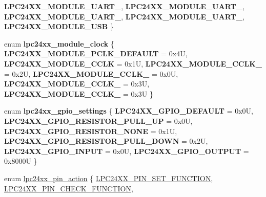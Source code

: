 \begin{DoxyCompactItemize}
{\bfseries L\+P\+C24\+X\+X\+\_\+\+M\+O\+D\+U\+L\+E\+\_\+\+U\+A\+R\+T\+\_}, 
{\bfseries L\+P\+C24\+X\+X\+\_\+\+M\+O\+D\+U\+L\+E\+\_\+\+U\+A\+R\+T\+\_}, 
{\bfseries L\+P\+C24\+X\+X\+\_\+\+M\+O\+D\+U\+L\+E\+\_\+\+U\+A\+R\+T\+\_}, 
\newline
{\bfseries L\+P\+C24\+X\+X\+\_\+\+M\+O\+D\+U\+L\+E\+\_\+\+U\+A\+R\+T\+\_}, 
{\bfseries L\+P\+C24\+X\+X\+\_\+\+M\+O\+D\+U\+L\+E\+\_\+\+U\+SB}
 \}
\item 
\mbox{\label{group__lpc24xx__io_gadac3c8787ce026e5996808d7efb3c546}} 
enum {\bfseries lpc24xx\+\_\+module\+\_\+clock} \{ \newline
{\bfseries L\+P\+C24\+X\+X\+\_\+\+M\+O\+D\+U\+L\+E\+\_\+\+P\+C\+L\+K\+\_\+\+D\+E\+F\+A\+U\+LT} = 0x4U, 
{\bfseries L\+P\+C24\+X\+X\+\_\+\+M\+O\+D\+U\+L\+E\+\_\+\+C\+C\+LK} = 0x1U, 
{\bfseries L\+P\+C24\+X\+X\+\_\+\+M\+O\+D\+U\+L\+E\+\_\+\+C\+C\+L\+K\+\_} = 0x2U, 
{\bfseries L\+P\+C24\+X\+X\+\_\+\+M\+O\+D\+U\+L\+E\+\_\+\+C\+C\+L\+K\+\_} = 0x0U, 
\newline
{\bfseries L\+P\+C24\+X\+X\+\_\+\+M\+O\+D\+U\+L\+E\+\_\+\+C\+C\+L\+K\+\_} = 0x3U, 
{\bfseries L\+P\+C24\+X\+X\+\_\+\+M\+O\+D\+U\+L\+E\+\_\+\+C\+C\+L\+K\+\_} = 0x3U
 \}
\item 
\mbox{\label{group__lpc24xx__io_ga0f0e1497847902b3f6fce2720a286971}} 
enum {\bfseries lpc24xx\+\_\+gpio\+\_\+settings} \{ \newline
{\bfseries L\+P\+C24\+X\+X\+\_\+\+G\+P\+I\+O\+\_\+\+D\+E\+F\+A\+U\+LT} = 0x0U, 
{\bfseries L\+P\+C24\+X\+X\+\_\+\+G\+P\+I\+O\+\_\+\+R\+E\+S\+I\+S\+T\+O\+R\+\_\+\+P\+U\+L\+L\+\_\+\+UP} = 0x0U, 
{\bfseries L\+P\+C24\+X\+X\+\_\+\+G\+P\+I\+O\+\_\+\+R\+E\+S\+I\+S\+T\+O\+R\+\_\+\+N\+O\+NE} = 0x1U, 
{\bfseries L\+P\+C24\+X\+X\+\_\+\+G\+P\+I\+O\+\_\+\+R\+E\+S\+I\+S\+T\+O\+R\+\_\+\+P\+U\+L\+L\+\_\+\+D\+O\+WN} = 0x2U, 
\newline
{\bfseries L\+P\+C24\+X\+X\+\_\+\+G\+P\+I\+O\+\_\+\+I\+N\+P\+UT} = 0x0U, 
{\bfseries L\+P\+C24\+X\+X\+\_\+\+G\+P\+I\+O\+\_\+\+O\+U\+T\+P\+UT} = 0x8000U
 \}
\item 
enum \mbox{\hyperlink{group__lpc24xx__io_ga5fb61bf67da6335979ce02d1d7f3630e}{lpc24xx\+\_\+pin\+\_\+action}} \{ \mbox{\hyperlink{group__lpc24xx__io_gga5fb61bf67da6335979ce02d1d7f3630ea7a7fa1e2dc8488faeeab3d902252a9fd}{L\+P\+C24\+X\+X\+\_\+\+P\+I\+N\+\_\+\+S\+E\+T\+\_\+\+F\+U\+N\+C\+T\+I\+ON}}, 
\mbox{\hyperlink{group__lpc24xx__io_gga5fb61bf67da6335979ce02d1d7f3630eabc0dce42787429aa06a7a9abcd8f4b28}{L\+P\+C24\+X\+X\+\_\+\+P\+I\+N\+\_\+\+C\+H\+E\+C\+K\+\_\+\+F\+U\+N\+C\+T\+I\+ON}}, 

\end{DoxyCompactItemize}
